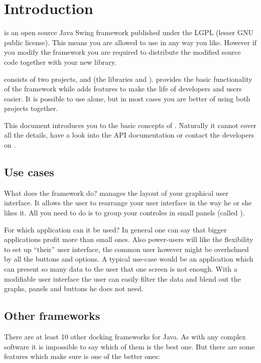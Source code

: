 \section{Introduction}
 is an open source Java Swing framework published under the LGPL (lesser GNU public license). This means you are allowed to use \linebreak {} in any way you like. However if you modify the framework you are required to distribute the modified source code together with your new library.

 consists of two projects,  and  (the libraries  and ).  provides the basic functionality of the framework while  adds features to make the life of developers and users easier. It is possible to use  alone, but in most cases you are better of using both projects together.

This document introduces you to the basic concepts of . Naturally it cannot cover all the details, have a look into the API documentation \linebreak {} or contact the developers on \linebreak {}.

\subsection{Use cases}
What does the framework do?  manages the layout of your graphical user interface. It allows the user to rearrange your user interface in the way he or she likes it. All you need to do is to group your controles in small panels (called ).

For which application can it be used? In general one can say that bigger applications profit more than small ones. Also power-users will like the flexibility to set up ``their'' user interface, the common user however might be overhelmed by all the buttons and options. A typical use-case would be an application which can present so many data to the user that one screen is not enough. With a modifiable user interface the user can easily filter the data and blend out the graphs, panels and buttons he does not need.

\subsection{Other frameworks}
There are at least 10 other docking frameworks for Java. As with any complex software it is impossible to say which of them is the best one. But there are some features which make sure  is one of the better ones:

